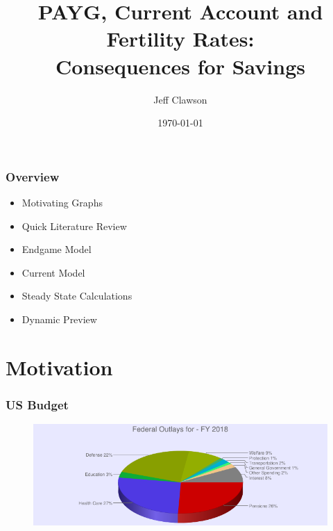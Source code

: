 \documentclass[11pt]{beamer}
\title[Econ 741 Project]{PAYG, Current Account and Fertility Rates: \\ Consequences for Savings}
\author[Clawson]{Jeff Clawson}
\date{\today}
\theoremstyle{definition}
\begin{document}
\begin{frame}
\titlepage %
\end{frame}

\begin{frame}
\frametitle{Overview} %
\begin{itemize}
    \item Motivating Graphs

    \item Quick Literature Review

    \item Endgame Model

    \item Current Model

    \item Steady State Calculations

    \item Dynamic Preview

\end{itemize}
\end{frame}



\section{Motivation} 
\begin{frame}
    \frametitle{US Budget}
\begin{figure}
	\centering
\includegraphics[scale=0.5]{chart.png}
	\label{V1}
\end{figure}

\end{frame}
\end{document}
